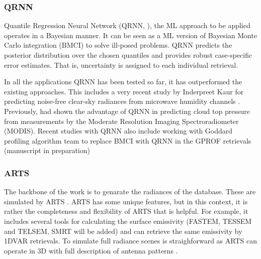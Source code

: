 \documentclass[12pt,oneside,a4paper]{article}
\begin{document}
\subsubsection{QRNN}
%
\label{sec:qrnn}

Quantile Regression Neural Network (QRNN, \citet{pfreundschuh:aneur:18}), the
ML approach to be applied operates in a Bayesian manner. It can be seen as a ML
version of Bayesian Monte Carlo integration (BMCI) to solve ill-posed problems.
QRNN predicts the posterior distribution over the chosen quantiles and provides
robust case-specific error estimates. That is, uncertainty is assigned to each
individual retrieval. 


In all the applications QRNN has been tested so far, it has outperformed the
existing approaches. This includes a very recent study by Inderpreet Kaur for
predicting noise-free clear-sky radiances from microwave humidity channels
\citep{kaur:2021:canma}. Previously, \citet{pfreundschuh:aneur:18} had shown
the advantage of QRNN in predicting cloud top pressure from measurements by the
Moderate Resolution Imaging Spectroradiometer (MODIS). Recent studies with QRNN
also include working with Goddard profiling algorithm \citep[GPROF,][] {kummerow:2015:thevo} team to replace
BMCI with QRNN in the GPROF retrievals (manuscript in
preparation)


\subsubsection{ARTS}
\label{sec:arts}
% 
The backbone of the work is to genarate the radiances of the database. These
are simulated by ARTS \citep[Atmospheric Radiative Transfer Simulator,][]
{eriksson:arts2:11}. ARTS has some unique features, but in this context,
it is rather the completeness and flexibility of ARTS that is helpful. For
example, it includes several tools for calculating the surface emissivity
(FASTEM, TESSEM and TELSEM, SMRT will be added) and can retrieve the same
emissivity by 1DVAR retrievals. To simulate full radiance scenes is
straighforward as ARTS can operate in 3D with full description of antenna
patterns \citep{duncan:anexp:19}.
\end{document}
